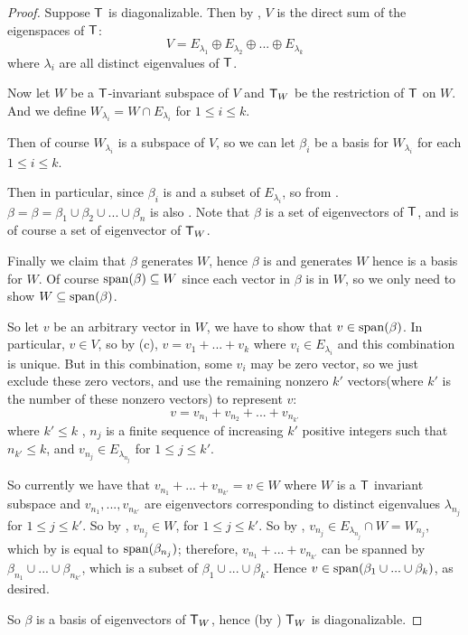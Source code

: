 \begin{proof}
Suppose \(\textsf{T}\) is diagonalizable.
Then by , \(V\) is the direct sum of the eigenspaces of \(\textsf{T}\):
\[
    V = E_{\lambda_1} \oplus E_{\lambda_2} \oplus ... \oplus E_{\lambda_k}
\]
where \(\lambda_i\) are all distinct eigenvalues of \(\textsf{T}\).

Now let \(W\) be a \(\textsf{T}\)-invariant subspace of \(V\) and \(\textsf{T}_W\) be the restriction of \(\textsf{T}\) on \(W\).
And we define \(W_{\lambda_i} = W \cap E_{\lambda_i}\) for \(1 \le i \le k\). 

Then of course \(W_{\lambda_i}\) is a subspace of \(V\), so we can let \(\beta_i\) be a basis for \(W_{\lambda_i}\) for each \(1 \le i \le k\). 

Then in particular, since \(\beta_i\) is \LID{} and a subset of \(E_{\lambda_i}\), so from .
\(\beta = \beta = \beta_1 \cup \beta_2 \cup ... \cup \beta_n\) is also \LID{}.
Note that \(\beta\) is a set of eigenvectors of \(\textsf{T}\), and is of course a set of eigenvector of \(\textsf{T}_W\).

Finally we claim that \(\beta\) generates \(W\), hence \(\beta\) is \LID{} and generates \(W\) hence is a basis for \(W\).
Of course \(\operatorname{span}(\beta) \subseteq W\) since each vector in \(\beta\) is in \(W\), so we only need to show \(W \subseteq \operatorname{span}(\beta)\).

So let \(v\) be an arbitrary vector in \(W\), we have to show that \(v \in \operatorname{span}(\beta)\).
In particular, \(v \in V\), so by (c), \(v = v_1 + ... + v_k\) where \(v_i \in E_{\lambda_i}\) and this combination is unique.
But in this combination, some \(v_i\) may be zero vector, so we just exclude these zero vectors, and use the remaining nonzero \(k'\) vectors(where \(k'\) is the number of these nonzero vectors) to represent \(v\):
\[
    v = v_{n_1} + v_{n_2} + ... + v_{n_{k'}}
\]
where \(k' \le k\) , \(n_j\) is a finite sequence of increasing \(k'\) positive integers such that \(n_{k'} \le k\), and \(v_{n_j} \in E_{\lambda_{n_j}}\) for \(1 \le j \le k'\).

So currently we have that \(v_{n_1} + ... + v_{n_{k'}} = v \in W\) where \(W\) is a \(\textsf{T}\) invariant subspace and \(v_{n_1}, ..., v_{n_{k'}}\) are eigenvectors corresponding to distinct eigenvalues \(\lambda_{n_j}\) for \(1 \le j \le k'\).
So by , \(v_{n_j} \in W\), for \(1 \le j \le k'\).
So by , \(v_{n_j} \in E_{\lambda_{n_j}} \cap W = W_{n_j}\), which by  is equal to \(\operatorname{span}(\beta_{n_j})\);
therefore, \(v_{n_1} + ... + v_{n_{k'}}\) can be spanned by \(\beta_{n_1} \cup ... \cup \beta_{n_{k'}}\), which is a subset of \(\beta_1 \cup ... \cup \beta_k\).
Hence \(v \in \operatorname{span}(\beta_1 \cup ... \cup \beta_k)\), as desired.

So \(\beta\) is a basis of eigenvectors of \(\textsf{T}_W\), hence (by ) \(\textsf{T}_W\) is diagonalizable.
\end{proof}

